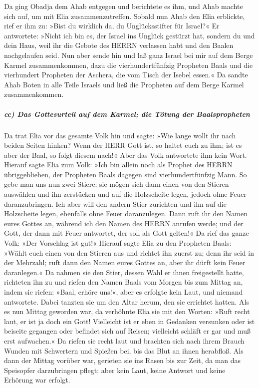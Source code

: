 Da ging Obadja dem Ahab entgegen und berichtete es ihm,
und Ahab machte sich auf, um mit Elia zusammenzutreffen.
Sobald nun Ahab den Elia erblickte, rief er ihm zu: »Bist
du wirklich da, du Unglücksstifter für Israel?« Er
antwortete: »Nicht ich bin es, der Israel ins Unglück gestürzt hat,
sondern du und dein Haus, weil ihr die Gebote des HERRN verlassen habt
und den Baalen nachgelaufen seid. Nun aber sende hin und
laß ganz Israel bei mir auf dem Berge Karmel zusammenkommen, dazu die
vierhundertfünfzig Propheten Baals und die vierhundert Propheten der
Aschera, die vom Tisch der Isebel essen.« Da sandte Ahab
Boten in alle Teile Israels und ließ die Propheten auf dem Berge Karmel
zusammenkommen.

\hypertarget{cc-das-gottesurteil-auf-dem-karmel-die-tuxf6tung-der-baalspropheten}{%
\subparagraph{cc) Das Gottesurteil auf dem Karmel; die Tötung der
Baalspropheten}\label{cc-das-gottesurteil-auf-dem-karmel-die-tuxf6tung-der-baalspropheten}}

Da trat Elia vor das gesamte Volk hin und sagte: »Wie
lange wollt ihr nach beiden Seiten hinken? Wenn der HERR Gott ist, so
haltet euch zu ihm; ist es aber der Baal, so folgt diesem nach!« Aber
das Volk antwortete ihm kein Wort. Hierauf sagte Elia zum
Volk: »Ich bin allein noch als Prophet des HERRN übriggeblieben, der
Propheten Baals dagegen sind vierhundertfünfzig Mann. So
gebe man uns nun zwei Stiere; sie mögen sich dann einen von den Stieren
auswählen und ihn zerstücken und auf die Holzscheite legen, jedoch ohne
Feuer daranzubringen. Ich aber will den andern Stier zurichten und ihn
auf die Holzscheite legen, ebenfalls ohne Feuer daranzulegen.
Dann ruft ihr den Namen eures Gottes an, während ich den
Namen des HERRN anrufen werde; und der Gott, der dann mit Feuer
antwortet, der soll als Gott gelten!« Da rief das ganze Volk: »Der
Vorschlag ist gut!« Hierauf sagte Elia zu den Propheten
Baals: »Wählt euch einen von den Stieren aus und richtet ihn zuerst zu;
denn ihr seid in der Mehrzahl; ruft dann den Namen eures Gottes an, aber
ihr dürft kein Feuer daranlegen.« Da nahmen sie den
Stier, dessen Wahl er ihnen freigestellt hatte, richteten ihn zu und
riefen den Namen Baals vom Morgen bis zum Mittag an, indem sie riefen:
»Baal, erhöre uns!«, aber es erfolgte kein Laut, und niemand antwortete.
Dabei tanzten sie um den Altar herum, den sie errichtet hatten.
Als es nun Mittag geworden war, da verhöhnte Elia sie mit
den Worten: »Ruft recht laut, er ist ja doch ein Gott! Vielleicht ist er
eben in Gedanken versunken oder ist beiseite gegangen oder befindet sich
auf Reisen; vielleicht schläft er gar und muß erst aufwachen.«
Da riefen sie recht laut und brachten sich nach ihrem
Brauch Wunden mit Schwertern und Spießen bei, bis das Blut an ihnen
herabfloß. Als dann der Mittag vorüber war, gerieten sie
ins Rasen bis zur Zeit, da man das Speisopfer darzubringen pflegt; aber
kein Laut, keine Antwort und keine Erhörung war erfolgt.

